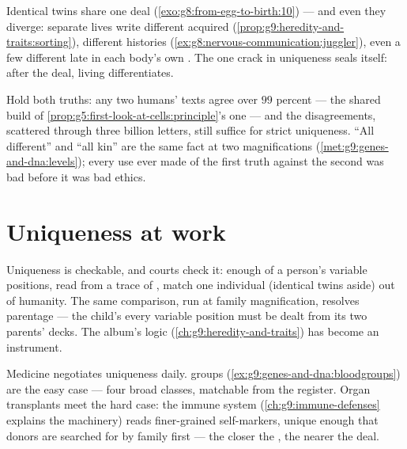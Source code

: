 \begin{example}\label{ex:g9:unique-individuals:twins}
Identical twins share one deal
(\cref{exo:g8:from-egg-to-birth:10}) --- and even they
diverge: separate lives write different acquired 
(\cref{prop:g9:heredity-and-traits:sorting}), different
 histories
(\cref{ex:g8:nervous-communication:juggler}), even a few
different late  in each body's own . The one
crack in uniqueness seals itself: after the deal, living
differentiates.
\end{example}

\begin{remark}\label{rem:g9:unique-individuals:alike}
Hold both truths: any two humans'  texts agree over
$99$ percent --- the shared build of
\cref{prop:g5:first-look-at-cells:principle}'s one 
--- and the disagreements, scattered through three billion
letters, still suffice for strict uniqueness. ``All
different'' and ``all kin'' are the same fact at two
magnifications
(\cref{met:g9:genes-and-dna:levels}); every use ever made
of the first truth against the second was bad 
before it was bad ethics.
\end{remark}

\section{Uniqueness at work}

\begin{example}\label{ex:g9:unique-individuals:forensics}
Uniqueness is checkable, and courts check it: enough of a
person's variable positions, read from a trace of ,
match one individual (identical twins aside) out of
humanity. The same comparison, run at family
magnification, resolves parentage --- the child's every
variable position must be dealt from its two parents'
decks. The album's logic
(\cref{ch:g9:heredity-and-traits}) has become an
instrument.
\end{example}

\begin{example}\label{ex:g9:unique-individuals:medicine}
Medicine negotiates uniqueness daily.  groups
(\cref{ex:g9:genes-and-dna:bloodgroups}) are the easy
case --- four broad classes, matchable from the register.
Organ transplants meet the hard case: the immune system
(\cref{ch:g9:immune-defenses} explains the machinery)
reads finer-grained self-markers, unique enough that
donors are searched for by family first --- the closer the
, the nearer the deal.
\end{example}

